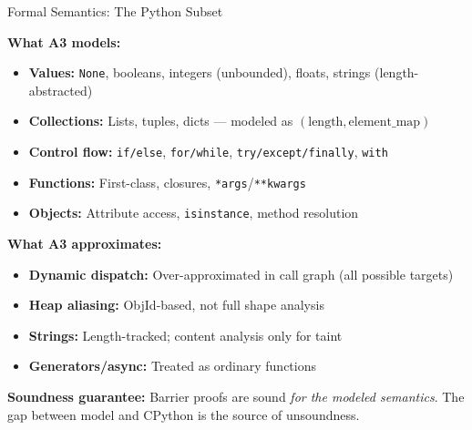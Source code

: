 \documentclass[aspectratio=169]{beamer}
\begin{document}
\begin{frame}{Formal Semantics: The Python Subset}

\textbf{What A3 models:}
\begin{itemize}
  \item \textbf{Values:} \texttt{None}, booleans, integers (unbounded), floats, strings (length-abstracted)
  \item \textbf{Collections:} Lists, tuples, dicts --- modeled as $(\text{length}, \text{element\_map})$
  \item \textbf{Control flow:} \texttt{if/else}, \texttt{for/while}, \texttt{try/except/finally}, \texttt{with}
  \item \textbf{Functions:} First-class, closures, \texttt{*args}/\texttt{**kwargs}
  \item \textbf{Objects:} Attribute access, \texttt{isinstance}, method resolution
\end{itemize}

\vspace{0.5em}
\textbf{What A3 approximates:}
\begin{itemize}
  \item \textbf{Dynamic dispatch:} Over-approximated in call graph (all possible targets)
  \item \textbf{Heap aliasing:} ObjId-based, not full shape analysis
  \item \textbf{Strings:} Length-tracked; content analysis only for taint
  \item \textbf{Generators/async:} Treated as ordinary functions
\end{itemize}

\vspace{0.3em}
\textbf{Soundness guarantee:} Barrier proofs are sound \emph{for the modeled semantics}. The gap between model and CPython is the source of unsoundness.

\end{frame}
\end{document}
